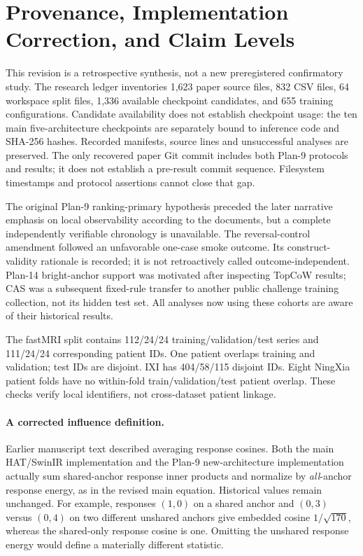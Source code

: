 \section{Provenance, Implementation Correction, and Claim Levels}
This revision is a retrospective synthesis, not a new preregistered confirmatory study. The research ledger inventories 1,623 paper source files, 832 CSV files, 64 workspace split files, 1,336 available checkpoint candidates, and 655 training configurations. Candidate availability does not establish checkpoint usage: the ten main five-architecture checkpoints are separately bound to inference code and SHA-256 hashes. Recorded manifests, source lines and unsuccessful analyses are preserved. The only recovered paper Git commit includes both Plan-9 protocols and results; it does not establish a pre-result commit sequence. Filesystem timestamps and protocol assertions cannot close that gap.

The original Plan-9 ranking-primary hypothesis preceded the later narrative emphasis on local observability according to the documents, but a complete independently verifiable chronology is unavailable. The reversal-control amendment followed an unfavorable one-case smoke outcome. Its construct-validity rationale is recorded; it is not retroactively called outcome-independent. Plan-14 bright-anchor support was motivated after inspecting TopCoW results; CAS was a subsequent fixed-rule transfer to another public challenge training collection, not its hidden test set. All analyses now using these cohorts are aware of their historical results.

The fastMRI split contains 112/24/24 training/validation/test series and 111/24/24 corresponding patient IDs. One patient overlaps training and validation; test IDs are disjoint. IXI has 404/58/115 disjoint IDs. Eight NingXia patient folds have no within-fold train/validation/test patient overlap. These checks verify local identifiers, not cross-dataset patient linkage.

\paragraph{A corrected influence definition.}
Earlier manuscript text described averaging response cosines. Both the main HAT/SwinIR implementation and the Plan-9 new-architecture implementation actually sum shared-anchor response inner products and normalize by \emph{all}-anchor response energy, as in the revised main equation. Historical values remain unchanged. For example, responses $(1,0)$ on a shared anchor and $(0,3)$ versus $(0,4)$ on two different unshared anchors give embedded cosine $1/\sqrt{170}$, whereas the shared-only response cosine is one. Omitting the unshared response energy would define a materially different statistic.

